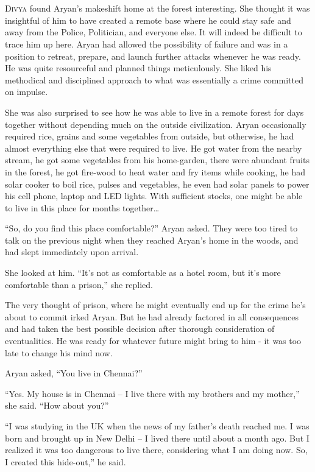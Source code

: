 \chapter{}

\lettrine{D}{ivya} found Aryan's makeshift home at the forest interesting. She thought it was
insightful of him to have created a remote base where he could stay safe and
away from the Police, Politician, and everyone else. It will indeed be difficult
to trace him up here. Aryan had allowed the possibility of failure and was in a
position to retreat, prepare, and launch further attacks whenever he was ready.
He was quite resourceful and planned things meticulously. She liked his
methodical and disciplined approach to what was essentially a crime committed on
impulse.

She was also surprised to see how he was able to live in a remote forest for
days together without depending much on the outside civilization. Aryan
occasionally required rice, grains and some vegetables from outside, but
otherwise, he had almost everything else that were required to live. He got
water from the nearby stream, he got some vegetables from his home-garden, there
were abundant fruits in the forest, he got fire-wood to heat water and fry items
while cooking, he had solar cooker to boil rice, pulses and vegetables, he even
had solar panels to power his cell phone, laptop and LED lights. With sufficient
stocks, one might be able to live in this place for months together…

“So, do you find this place comfortable?” Aryan asked. They were too tired to
talk on the previous night when they reached Aryan's home in the woods, and had
slept immediately upon arrival.

She looked at him. “It's not as comfortable as a hotel room, but it's more
comfortable than a prison,” she replied.

The very thought of prison, where he might eventually end up for the crime he's
about to commit irked Aryan. But he had already factored in all consequences and
had taken the best possible decision after thorough consideration of
eventualities. He was ready for whatever future might bring to him - it was too
late to change his mind now.

Aryan asked, “You live in Chennai?”

“Yes. My house is in Chennai – I live there with my brothers and my mother,” she
said. “How about you?”

“I was studying in the UK when the news of my father's death reached me. I was
born and brought up in New Delhi – I lived there until about a month ago. But I
realized it was too dangerous to live there, considering what I am doing now.
So, I created this hide-out,” he said.

